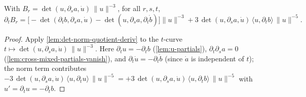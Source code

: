 \begin{lemma}
    \label{lem:deformed-B-t-partial}
    With $B_r=\det(u,\partial_s a,\dot u)\,\lVert u\rVert^{-3}$, for all $r,s,t$,
    \[
        \partial_t B_r =
        \bigl[-\det(\partial_t b,\partial_s a,\dot u)
              -\det(u,\partial_s a,\partial_t\dot b)\bigr]\lVert u\rVert^{-3}
        +3\,\det(u,\partial_s a,\dot u)\,\langle u,\partial_t b\rangle\,\lVert u\rVert^{-5}.
    \]
\end{lemma}
\begin{proof}
    Apply \cref{lem:det-norm-quotient-deriv} to the $t$-curve
    $t\mapsto\det(u,\partial_s a,\dot u)\,\lVert u\rVert^{-3}$. Here
    $\partial_t u=-\partial_t b$ (\cref{lem:u-partials}),
    $\partial_t\partial_s a=0$ (\cref{lem:cross-mixed-partials-vanish}), and
    $\partial_t\dot u=-\partial_t\dot b$ (since $\dot a$ is independent of $t$); the
    norm term contributes
    $-3\,\det(u,\partial_s a,\dot u)\,\langle u,\partial_t u\rangle\,\lVert u\rVert^{-5}
    =+3\,\det(u,\partial_s a,\dot u)\,\langle u,\partial_t b\rangle\,\lVert u\rVert^{-5}$
    with $u'=\partial_t u=-\partial_t b$.
\end{proof}

